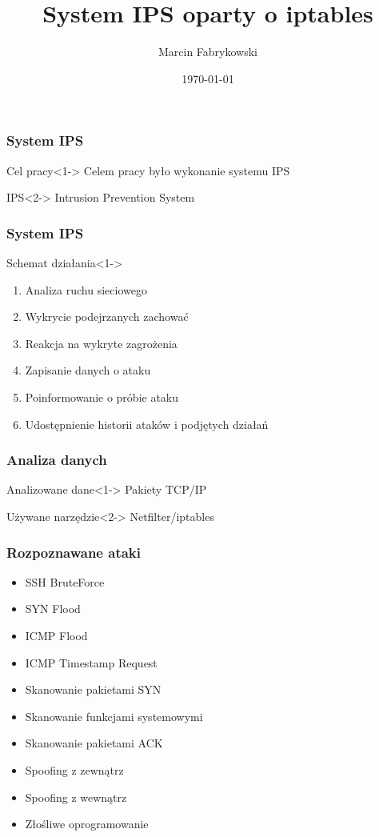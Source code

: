 \documentclass{beamer}
\title{System IPS oparty o iptables}
\author{Marcin Fabrykowski}
\date{\today}
\begin{document}
\titleframe[pl]


\begin{frame}
	\frametitle{System IPS}
	\begin{block}{Cel pracy}<1->
		Celem pracy było wykonanie systemu IPS
	\end{block}
	\begin{block}{IPS}<2->
		Intrusion Prevention System
	\end{block}
\end{frame}





\begin{frame}
\frametitle{System IPS}
	\begin{block}{Schemat działania}<1->
		\begin{enumerate}
			\item Analiza ruchu sieciowego
			\item Wykrycie podejrzanych zachować
			\item Reakcja na wykryte zagrożenia
			\item Zapisanie danych o ataku
			\item Poinformowanie o próbie ataku
			\item Udostępnienie historii ataków i podjętych działań
		\end{enumerate}
	\end{block}
\end{frame}
\begin{frame}
\frametitle{Analiza danych}
	\begin{block}{Analizowane dane}<1->
	Pakiety TCP/IP
	\end{block}
	\begin{block}{Używane narzędzie}<2->
	Netfilter/iptables
	\end{block}
\end{frame}
\begin{frame}
\frametitle{Rozpoznawane ataki}
	\begin{itemize}
		\item SSH BruteForce
		\item SYN Flood
		\item ICMP Flood
		\item ICMP Timestamp Request
		\item Skanowanie pakietami SYN
		\item Skanowanie funkcjami systemowymi
		\item Skanowanie pakietami ACK
		\item Spoofing z zewnątrz
		\item Spoofing z wewnątrz
		\item Złośliwe oprogramowanie
	\end{itemize}
\end{frame}
\end{document}
